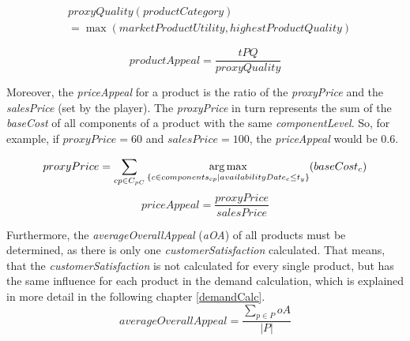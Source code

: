 \begin{equation}
\label{proxyQuality}
\begin{aligned}
    & proxyQuality(productCategory) \\
    & = \max(marketProductUtility, highestProductQuality)
\end{aligned}    
\end{equation}

\begin{equation}
    productAppeal = \dfrac{tPQ}{proxyQuality}
\end{equation}

Moreover, the \textit{priceAppeal} for a product is the ratio of the \textit{proxyPrice} and the \textit{salesPrice} (set by the player). The \textit{proxyPrice} in turn represents the sum of the \textit{baseCost} of all components of a product with the same \textit{componentLevel}. So, for example, if $proxyPrice = 60$ and $salesPrice = 100$, the \textit{priceAppeal} would be $0.6$.

\begin{equation}
    proxyPrice = \sum_{cp \in C_{pC}} \operatorname*{arg\,max}\limits_{\{c \in components_{cp}| availabilityDate_c \leq t_y\}}(baseCost_c)\\
\end{equation}
\begin{equation}
    priceAppeal = \dfrac{proxyPrice}{salesPrice}
\end{equation}

Furthermore, the \textit{averageOverallAppeal} (\textit{\gls{aOA}}) of all products must be determined, as there is only one \textit{customerSatisfaction} calculated. That means, that the \textit{customerSatisfaction} is not calculated for every single product, but has the same influence for each product in the demand calculation, which is explained in more detail in the following chapter \ref{demandCalc}.
\begin{equation}
    averageOverallAppeal = \frac{\sum_{p \in P} oA}{|P|}
\end{equation}

